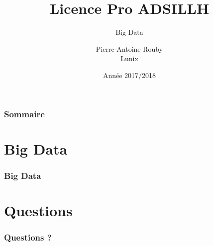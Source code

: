 \documentclass{beamer}
\title{Licence Pro ADSILLH}
\subtitle{Big Data}
\author{Pierre-Antoine Rouby\\Lunix}
\date{Année 2017/2018}
\begin{document}
\frame{\titlepage}

\begin{frame}
  \frametitle{Sommaire}
  \tableofcontents
\end{frame}

\section{Big Data}
\begin{frame}
  \frametitle{Big Data}
\end{frame}

\section{Questions}
\begin{frame}
  \frametitle{Questions ?}
\end{frame}
\end{document}
